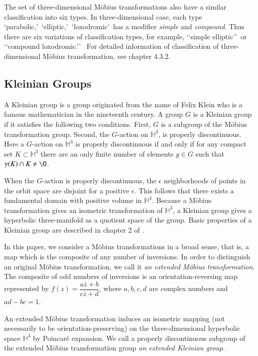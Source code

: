 The set of three-dimensional M\"obius transformations also have a similar
classification into six types.
In three-dimensional case, each type \lq parabolic,\rq~\lq elliptic,\rq~\lq loxodromic\rq~has 
a modifier \textit{simple} and \textit{compound}.
Thus there are six variations of classification types, for example, \lq\lq simple elliptic\rq\rq~or
\lq\lq compound loxodromic.\rq\rq~
For detailed information of classification of three-dimensional M\"obius transformation, see chapter 4.3.2.

\subsection{Kleinian Groups}

A Kleinian group is a group originated from the name of Felix Klein who is
a famous mathematician in the nineteenth century.
A group $G$ is a Kleinian group if it satisfies the following two
conditions. 
First, $G$ is a subgroup of the M\"obius transformation group.
Second, the $G$-action on $\mathbb{H}^3$,
is properly discontinuous.
Here a $G$-action on $\mathbb{H}^3$
is properly discontinuous if and only if
for any compact set $K \subset \mathbb{H}^3$
there are an only finite number of elements $g \in G$ such that
$\gamma (K) \cap K \neq \O$.

\noindent When the $G$-action is properly discontinuous, 
the $\epsilon$ neighborhoods of points in the orbit space are disjoint
for a positive $\epsilon$.
This follows that there exists a
fundamental domain with positive volume in $\mathbb{H}^3$.
Because a M\"obius transformation gives an isometric transformation of
$\mathbb{H}^3$, a Kleinian group gives a hyperbolic three-manifold 
as a quotient space of the group. 
Basic properties of a Kleinian group are described in chapter 2 of \cite{marden_2016}.

In this paper, we consider a M\"obius transformations in a broad sense, that is,
a map which is the composite of
any number of inversions.
In order to distinguish an original M\"obius transformation,
we call it \textit{an extended M\"obius transformation}.
The composite of odd numbers of inversions
is an orientation-reversing map represented by $f(z)=\dfrac{a{\bar{z}}+b}{c{\bar{z}}+d}$, where
$a, b, c, d$ are complex numbers and $ad-bc = 1$.

An extended M\"obius transformation induces an isometric mapping 
(not necessarily to be orientation-preserving) on the three-dimensional hyperbolic space $\mathbb{H}^3$ by
Poincar\'e expansion.
We call a properly discontinuous subgroup of the extended M\"obius transformation group
\textit{an extended Kleinian group}.


